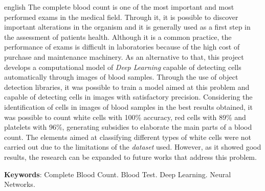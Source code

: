 \documentclass[
	10pt,				%
	oneside,
	a4paper,			%
	chapter=TITLE,		%
	english,			%
	brazil				%
	]{abntex2}
\begin{document}
\begin{resumo}[Abstract]
 \begin{otherlanguage*}{english}
		The complete blood count is one of the most important and most performed exams in the medical field. Through it, it is possible to discover important alterations in the organism and it is generally used as a first step in the assessment of patients health. Although it is a common practice, the performance of exams is difficult in laboratories because of the high cost of purchase and maintenance machinery. As an alternative to that, this project develops a computational model of \emph{Deep Learning} capable of detecting cells automatically through images of blood samples. Through the use of object detection libraries, it was possible to train a model aimed at this problem and capable of detecting cells in images with satisfactory precision. Considering the identification of cells in images of blood samples in the best results obtained, it was possible to count white cells with 100\% accuracy, red cells with 89\% and platelets with 96\%, generating subsidies to elaborate the main parts of a blood count. The elements aimed at classifying different types of white cells were not carried out due to the limitations of the \emph{dataset} used. However, as it showed good results, the research can be expanded to future works that address this problem.
		\vspace{\onelineskip}
		\noindent 
						
		\textbf{Keywords}: Complete Blood Count. Blood Test. Deep Learning. Neural Networks.
	\end{otherlanguage*}
\end{resumo}


\listoffigures*
\cleardoublepage
\listoftables*
\cleardoublepage



\cleardoublepage
\end{document}
